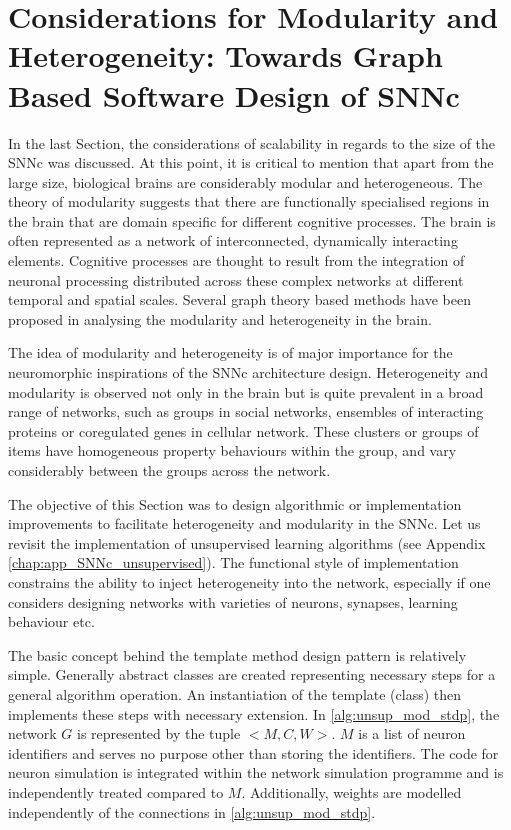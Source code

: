 \section{Considerations for Modularity and Heterogeneity: Towards Graph Based Software Design of SNNc}
In the last Section, the considerations of scalability in regards to the size of the SNNc was discussed. At this point, it is critical to mention that apart from the large size, biological brains are considerably modular and heterogeneous. The theory of modularity suggests that there are functionally specialised regions in the brain that are domain specific for different cognitive processes. The brain is often represented as a network of interconnected, dynamically interacting elements. Cognitive processes are thought to result from the integration of neuronal processing distributed across these complex networks at different temporal and spatial scales. Several graph theory based methods \citep{sporns2016modular, nicolini2016modular} have been proposed in analysing the modularity and heterogeneity in the brain.

The idea of modularity and heterogeneity is of major importance for the neuromorphic inspirations of the SNNc architecture design. Heterogeneity and modularity is observed not only in the brain but is quite prevalent in a broad range of networks, such as groups in social networks, ensembles of interacting proteins or coregulated genes in cellular network. These clusters or groups of items have homogeneous property behaviours within the group, and vary considerably between the groups across the network. 

The objective of this Section was to design algorithmic or implementation improvements to facilitate heterogeneity and modularity in the SNNc. Let us revisit the implementation of unsupervised learning algorithms (see Appendix \ref{chap:app_SNNc_unsupervised}). The functional style of implementation constrains the ability to inject heterogeneity into the network, especially if one considers designing networks with varieties of neurons, synapses, learning behaviour etc. 

The basic concept behind the template method design pattern is relatively simple. Generally abstract classes are created representing necessary steps for a general algorithm operation. An instantiation of the template (class) then implements these steps with necessary extension. In \algorithmname \ref{alg:unsup_mod_stdp}, the network $G$ is represented by the tuple $<M, C, W>$. $M$ is a list of neuron identifiers and serves no purpose other than storing the identifiers. The code for neuron simulation is integrated within the network simulation programme and is independently treated compared to $M$. Additionally, weights are modelled independently of the connections in \algorithmname \ref{alg:unsup_mod_stdp}. 

